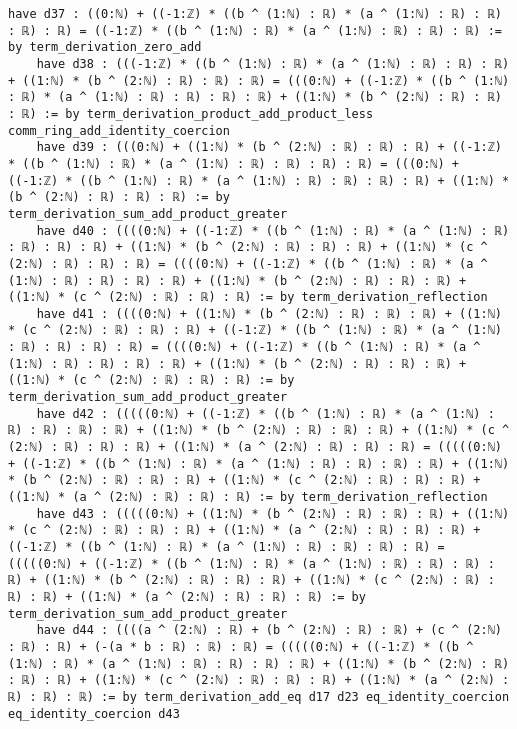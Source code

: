 \documentclass{article}
\begin{document}
\begin{tcolorbox}[colback=white!10, width=\linewidth]
\begin{lstlisting}[language=Lean4]
    have d37 : ((0:ℕ) + ((-1:ℤ) * ((b ^ (1:ℕ) : ℝ) * (a ^ (1:ℕ) : ℝ) : ℝ) : ℝ) : ℝ) = ((-1:ℤ) * ((b ^ (1:ℕ) : ℝ) * (a ^ (1:ℕ) : ℝ) : ℝ) : ℝ) := by term_derivation_zero_add
    have d38 : (((-1:ℤ) * ((b ^ (1:ℕ) : ℝ) * (a ^ (1:ℕ) : ℝ) : ℝ) : ℝ) + ((1:ℕ) * (b ^ (2:ℕ) : ℝ) : ℝ) : ℝ) = (((0:ℕ) + ((-1:ℤ) * ((b ^ (1:ℕ) : ℝ) * (a ^ (1:ℕ) : ℝ) : ℝ) : ℝ) : ℝ) + ((1:ℕ) * (b ^ (2:ℕ) : ℝ) : ℝ) : ℝ) := by term_derivation_product_add_product_less comm_ring_add_identity_coercion
    have d39 : (((0:ℕ) + ((1:ℕ) * (b ^ (2:ℕ) : ℝ) : ℝ) : ℝ) + ((-1:ℤ) * ((b ^ (1:ℕ) : ℝ) * (a ^ (1:ℕ) : ℝ) : ℝ) : ℝ) : ℝ) = (((0:ℕ) + ((-1:ℤ) * ((b ^ (1:ℕ) : ℝ) * (a ^ (1:ℕ) : ℝ) : ℝ) : ℝ) : ℝ) + ((1:ℕ) * (b ^ (2:ℕ) : ℝ) : ℝ) : ℝ) := by term_derivation_sum_add_product_greater
    have d40 : ((((0:ℕ) + ((-1:ℤ) * ((b ^ (1:ℕ) : ℝ) * (a ^ (1:ℕ) : ℝ) : ℝ) : ℝ) : ℝ) + ((1:ℕ) * (b ^ (2:ℕ) : ℝ) : ℝ) : ℝ) + ((1:ℕ) * (c ^ (2:ℕ) : ℝ) : ℝ) : ℝ) = ((((0:ℕ) + ((-1:ℤ) * ((b ^ (1:ℕ) : ℝ) * (a ^ (1:ℕ) : ℝ) : ℝ) : ℝ) : ℝ) + ((1:ℕ) * (b ^ (2:ℕ) : ℝ) : ℝ) : ℝ) + ((1:ℕ) * (c ^ (2:ℕ) : ℝ) : ℝ) : ℝ) := by term_derivation_reflection
    have d41 : ((((0:ℕ) + ((1:ℕ) * (b ^ (2:ℕ) : ℝ) : ℝ) : ℝ) + ((1:ℕ) * (c ^ (2:ℕ) : ℝ) : ℝ) : ℝ) + ((-1:ℤ) * ((b ^ (1:ℕ) : ℝ) * (a ^ (1:ℕ) : ℝ) : ℝ) : ℝ) : ℝ) = ((((0:ℕ) + ((-1:ℤ) * ((b ^ (1:ℕ) : ℝ) * (a ^ (1:ℕ) : ℝ) : ℝ) : ℝ) : ℝ) + ((1:ℕ) * (b ^ (2:ℕ) : ℝ) : ℝ) : ℝ) + ((1:ℕ) * (c ^ (2:ℕ) : ℝ) : ℝ) : ℝ) := by term_derivation_sum_add_product_greater
    have d42 : (((((0:ℕ) + ((-1:ℤ) * ((b ^ (1:ℕ) : ℝ) * (a ^ (1:ℕ) : ℝ) : ℝ) : ℝ) : ℝ) + ((1:ℕ) * (b ^ (2:ℕ) : ℝ) : ℝ) : ℝ) + ((1:ℕ) * (c ^ (2:ℕ) : ℝ) : ℝ) : ℝ) + ((1:ℕ) * (a ^ (2:ℕ) : ℝ) : ℝ) : ℝ) = (((((0:ℕ) + ((-1:ℤ) * ((b ^ (1:ℕ) : ℝ) * (a ^ (1:ℕ) : ℝ) : ℝ) : ℝ) : ℝ) + ((1:ℕ) * (b ^ (2:ℕ) : ℝ) : ℝ) : ℝ) + ((1:ℕ) * (c ^ (2:ℕ) : ℝ) : ℝ) : ℝ) + ((1:ℕ) * (a ^ (2:ℕ) : ℝ) : ℝ) : ℝ) := by term_derivation_reflection
    have d43 : (((((0:ℕ) + ((1:ℕ) * (b ^ (2:ℕ) : ℝ) : ℝ) : ℝ) + ((1:ℕ) * (c ^ (2:ℕ) : ℝ) : ℝ) : ℝ) + ((1:ℕ) * (a ^ (2:ℕ) : ℝ) : ℝ) : ℝ) + ((-1:ℤ) * ((b ^ (1:ℕ) : ℝ) * (a ^ (1:ℕ) : ℝ) : ℝ) : ℝ) : ℝ) = (((((0:ℕ) + ((-1:ℤ) * ((b ^ (1:ℕ) : ℝ) * (a ^ (1:ℕ) : ℝ) : ℝ) : ℝ) : ℝ) + ((1:ℕ) * (b ^ (2:ℕ) : ℝ) : ℝ) : ℝ) + ((1:ℕ) * (c ^ (2:ℕ) : ℝ) : ℝ) : ℝ) + ((1:ℕ) * (a ^ (2:ℕ) : ℝ) : ℝ) : ℝ) := by term_derivation_sum_add_product_greater
    have d44 : ((((a ^ (2:ℕ) : ℝ) + (b ^ (2:ℕ) : ℝ) : ℝ) + (c ^ (2:ℕ) : ℝ) : ℝ) + (-(a * b : ℝ) : ℝ) : ℝ) = (((((0:ℕ) + ((-1:ℤ) * ((b ^ (1:ℕ) : ℝ) * (a ^ (1:ℕ) : ℝ) : ℝ) : ℝ) : ℝ) + ((1:ℕ) * (b ^ (2:ℕ) : ℝ) : ℝ) : ℝ) + ((1:ℕ) * (c ^ (2:ℕ) : ℝ) : ℝ) : ℝ) + ((1:ℕ) * (a ^ (2:ℕ) : ℝ) : ℝ) : ℝ) := by term_derivation_add_eq d17 d23 eq_identity_coercion eq_identity_coercion d43

\end{lstlisting}
\end{tcolorbox}
\end{document}
